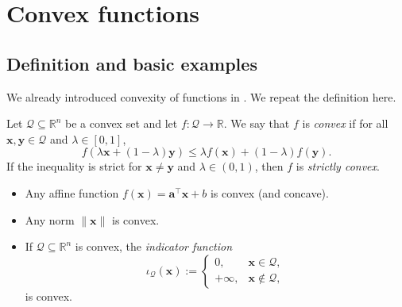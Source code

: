 \section{Convex functions}
\label{sec:ch4-convex-functions}
\subsection{Definition and basic examples}
\label{sec:ch4-def-convex-function}
We already introduced convexity of functions in . We
repeat the definition here.

\begin{definition}
Let $\mathcal{Q}\subseteq \mathbb{R}^n$ be a convex set and let $f:\mathcal{Q}\to\mathbb{R}$.
We say that $f$ is \emph{convex} if for all $\mathbf{x},\mathbf{y}\in\mathcal{Q}$ and $\lambda\in[0,1]$,
\[
  f(\lambda\mathbf{x}+(1-\lambda)\mathbf{y})
  \le \lambda f(\mathbf{x})+(1-\lambda)f(\mathbf{y}).
\]
If the inequality is strict for $\mathbf{x}\neq \mathbf{y}$ and $\lambda\in(0,1)$, then $f$ is \emph{strictly convex}.
\end{definition}

\begin{example}
\leavevmode
\begin{itemize}
  \item Any affine function $f(\mathbf{x})=\mathbf{a}^\top \mathbf{x}+b$ is convex (and concave).
  \item Any norm $\|\mathbf{x}\|$ is convex.
  \item If $\mathcal{Q}\subseteq \mathbb{R}^n$ is convex, the \emph{indicator function}
  \[
    \iota_{\mathcal{Q}}(\mathbf{x}):=
    \begin{cases}
      0, & \mathbf{x}\in\mathcal{Q},\\
      +\infty, & \mathbf{x}\notin\mathcal{Q},
    \end{cases}
  \]
  is convex.
\end{itemize}
\end{example}

